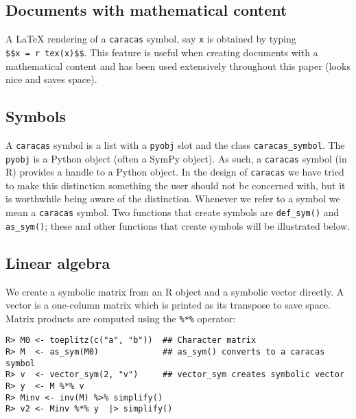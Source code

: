 \hypertarget{documents-with-mathematical-content}{%
\subsection{Documents with mathematical content}\label{documents-with-mathematical-content}}

A LaTeX rendering of a \texttt{caracas} symbol, say \texttt{x} is obtained by typing
\texttt{\$\$x\ =\ \textasciigrave{}r\ tex(x)\textasciigrave{}\$\$}. This feature is useful
when creating documents with a mathematical content and has been used
extensively throughout this paper (looks nice and saves space).

\hypertarget{symbols}{%
\subsection{Symbols}\label{symbols}}

A \texttt{caracas} symbol is a list with a \texttt{pyobj} slot and the class
\texttt{caracas\_symbol}. The \texttt{pyobj} is a Python object (often a SymPy
object). As such, a \texttt{caracas} symbol (in R) provides a handle to a
Python object. In the design of \texttt{caracas} we have tried to make
this distinction something the user should not be concerned with, but
it is worthwhile being aware of the distinction. Whenever we refer to
a symbol we mean a \texttt{caracas} symbol. Two functions that create
symbols are \texttt{def\_sym()} and \texttt{as\_sym()}; these and other functions that
create symbols will be illustrated below.

\hypertarget{linear-algebra}{%
\subsection{Linear algebra}\label{linear-algebra}}

We create a symbolic matrix from an R object and a symbolic
vector directly. A vector is a one-column matrix which is printed as
its transpose to save space. Matrix products are computed using the
\texttt{\%*\%} operator:

\begin{verbatim}
R> M0 <- toeplitz(c("a", "b"))  ## Character matrix
R> M  <- as_sym(M0)             ## as_sym() converts to a caracas symbol
R> v  <- vector_sym(2, "v")     ## vector_sym creates symbolic vector
R> y  <- M %*% v
R> Minv <- inv(M) %>% simplify()
R> v2 <- Minv %*% y  |> simplify()
\end{verbatim}

